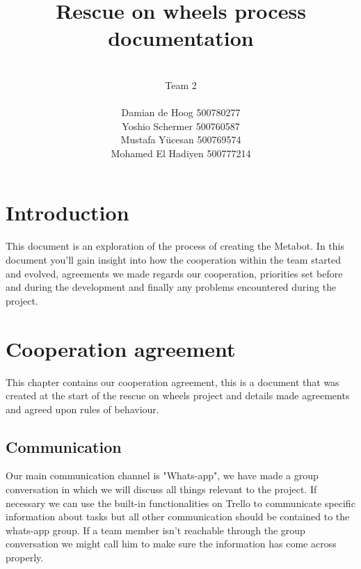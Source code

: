 \documentclass[12pt]{article}
\begin{document}
	\title{\huge Rescue on wheels process documentation}
	\author{\\Team 2\\ \\Damian de Hoog 500780277\\ Yoshio Schermer 500760587\\Mustafa Y\"{u}cesan 500769574\\ Mohamed El Hadiyen 500777214}
	\maketitle
	\newpage
	\tableofcontents
	\newpage
	\section{Introduction}
	This document is an exploration of the process of creating the Metabot. In this document you'll gain insight into how the cooperation within the team started and evolved, agreements we made regards our cooperation, priorities set before and during the development and finally any problems encountered during the project.
	\newpage
	\section{Cooperation agreement}
	This chapter contains our cooperation agreement, this is a document that was created at the start of the rescue on wheels project and details made agreements and agreed upon rules of behaviour.
	\subsection{Communication}
	Our main communication channel is "Whats-app", we have made a group conversation in which we will discuss all things relevant to the project. If necessary we can use the built-in functionalities on Trello to communicate specific information about tasks but all other communication should be contained to the whats-app group. If a team member isn't reachable through the group conversation we might call him to make sure the information has come across properly.
\end{document}

